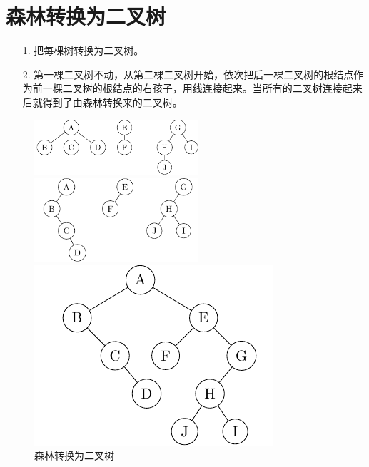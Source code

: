 \documentclass[10pt]{article}
\begin{document}
\section{森林转换为二叉树}
\begin{itemize}
\item[1.]  把每棵树转换为二叉树。 
\item[2.]  第一棵二叉树不动，从第二棵二叉树开始，依次把后一棵二叉树的根结点作为前一棵二叉树的根结点的右孩子，用线连接起来。当所有的二叉树连接起来后就得到了由森林转换来的二叉树。
\end{itemize}
\begin{figure}[htbp]
\centering
\begin{minipage}{0.45\textwidth}
\includegraphics[width=2.4in]{TIKZ/forest/forest2btree1.pdf}  
\end{minipage}
\begin{minipage}{0.45\textwidth}
\includegraphics[width=2.4in]{TIKZ/forest/forest2btree2.pdf}  
\end{minipage}   
\begin{minipage}{0.45\textwidth}
\includegraphics[width=2.in]{TIKZ/forest/forest2btree3.pdf}  
\end{minipage}
\caption{森林转换为二叉树} 
\end{figure}
\end{document}
